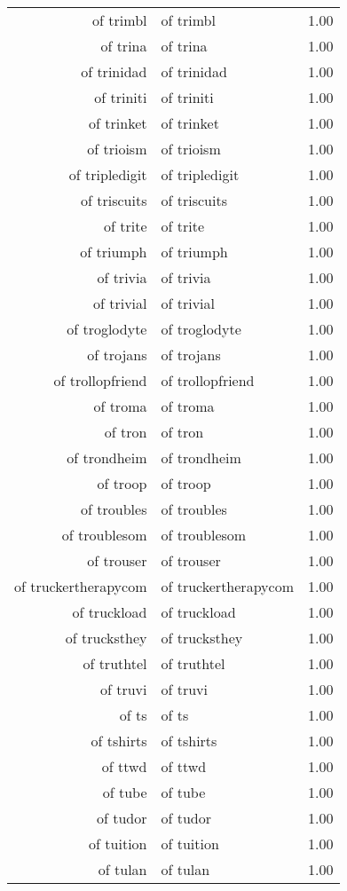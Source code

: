 \begin{table}[ht]
\begin{tabular}{rlr}
  of trimbl & of trimbl & 1.00 \\ 
  of trina & of trina & 1.00 \\ 
  of trinidad & of trinidad & 1.00 \\ 
  of triniti & of triniti & 1.00 \\ 
  of trinket & of trinket & 1.00 \\ 
  of trioism & of trioism & 1.00 \\ 
  of tripledigit & of tripledigit & 1.00 \\ 
  of triscuits & of triscuits & 1.00 \\ 
  of trite & of trite & 1.00 \\ 
  of triumph & of triumph & 1.00 \\ 
  of trivia & of trivia & 1.00 \\ 
  of trivial & of trivial & 1.00 \\ 
  of troglodyte & of troglodyte & 1.00 \\ 
  of trojans & of trojans & 1.00 \\ 
  of trollopfriend & of trollopfriend & 1.00 \\ 
  of troma & of troma & 1.00 \\ 
  of tron & of tron & 1.00 \\ 
  of trondheim & of trondheim & 1.00 \\ 
  of troop & of troop & 1.00 \\ 
  of troubles & of troubles & 1.00 \\ 
  of troublesom & of troublesom & 1.00 \\ 
  of trouser & of trouser & 1.00 \\ 
  of truckertherapycom & of truckertherapycom & 1.00 \\ 
  of truckload & of truckload & 1.00 \\ 
  of trucksthey & of trucksthey & 1.00 \\ 
  of truthtel & of truthtel & 1.00 \\ 
  of truvi & of truvi & 1.00 \\ 
  of ts & of ts & 1.00 \\ 
  of tshirts & of tshirts & 1.00 \\ 
  of ttwd & of ttwd & 1.00 \\ 
  of tube & of tube & 1.00 \\ 
  of tudor & of tudor & 1.00 \\ 
  of tuition & of tuition & 1.00 \\ 
  of tulan & of tulan & 1.00 \\ 

\end{tabular}
\end{table}
